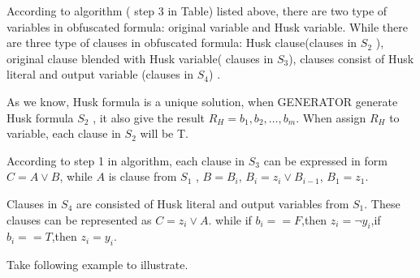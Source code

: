 \documentclass[runningheads,a4paper]{llncs}
\begin{document}
According to algorithm ( step 3 in Table) listed above, there are two type of variables in obfuscated formula: original variable and Husk variable. 
While there are three type of clauses in obfuscated formula: Husk clause(clauses in $S_2$ ),
original clause blended with Husk variable( clauses in $S_3$),
clauses consist of Husk literal and output variable (clauses in $S_4$) .

As we know, Husk formula is a unique solution, when GENERATOR generate Husk formula $S_2$ , it also give the result $R_H={b_1,b_2,\dots,b_m}$. When assign $R_H$ to variable, each clause in $S_2$ will be T.

According to step 1 in algorithm, each clause in $S_3$ can be expressed in form $C=A\vee B$, while $A$ is clause from $S_1$ , $B=B_i$, $B_i=z_i\vee B_{i-1}$, $B_1= z_1$.

% 
% 


% 
% 
% 
% 
% 
% 
% 
% 
% 
% 
% 
% 
% 

Clauses in $S_4$ are consisted of Husk literal and output variables from $S_1$.
These clauses can be represented as $C= z_i\vee A$. while if $b_i==F$,then $z_i= \neg y_i$,if $b_i ==T$,then $z_i =y_i$.

Take following example to illustrate.
\end{document}
